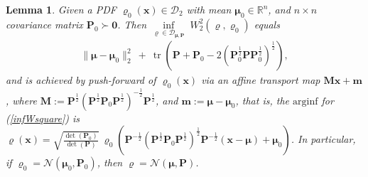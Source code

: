 \documentclass[letterpaper,10pt,twocolumn,conference]{ieeeconf}
\newtheorem{lemma}{Lemma}
\newcommand{\cD}{{\mathscr{D}}}
\newcommand{\tr}{\operatorname{tr}}
\begin{document}
\begin{lemma}\label{WsqareProjLemma}
Given a PDF $\varrho_{0}(\bm{x})\in\cD_{2}$ with mean $\bm{\mu}_{0}\in\mathbb{R}^{n}$, and $n\times n$ covariance matrix $\bm{P}_{0} \succ \bm{0}$. Then $\underset{\varrho\in\cD_{\bm{\mu},\bm{P}}}{\inf} \; W_{2}^{2}\left(\varrho,\varrho_{0}\right)$ equals
	\begin{eqnarray}
	 \parallel\bm{\mu}-\bm{\mu}_{0}\parallel_{2}^{2} \: + \: \tr\left(\bm{P} + \bm{P}_{0} - 2 \left(\bm{P}_{0}^{\frac{1}{2}} \bm{P} \bm{P}_{0}^{\frac{1}{2}}\right)^{\frac{1}{2}}\right),
	\label{infWsquare}	
	\end{eqnarray}
and is achieved by push-forward of $\varrho_{0}(\bm{x})$ via an affine transport map $\bm{M}\bm{x} + \bm{m}$, where $\bm{M} := \bm{P}^{\frac{1}{2}} \left(\bm{P}^{\frac{1}{2}}\bm{P}_{0}\bm{P}^{\frac{1}{2}}\right)^{-\frac{1}{2}} \bm{P}^{\frac{1}{2}}$, and $\bm{m}:=\bm{\mu}-\bm{\mu}_{0}$, that is, the $\mathrm{arginf}$ for (\ref{infWsquare}) is $\varrho(\bm{x}) = \sqrt{\frac{\det(\bm{P}_{0})}{\det(\bm{P})}}\:\varrho_{0}\left( \bm{P}^{-\frac{1}{2}} \left(\bm{P}^{\frac{1}{2}}\bm{P}_{0}\bm{P}^{\frac{1}{2}}\right)^{\frac{1}{2}} \bm{P}^{-\frac{1}{2}}\left(\bm{x} - \bm{\mu}\right) + \bm{\mu}_{0}\right)$. In particular, if $\varrho_{0} = \mathcal{N}\left(\bm{\mu}_{0},\bm{P}_{0}\right)$, then $\varrho = \mathcal{N}\left(\bm{\mu},\bm{P}\right)$.
\end{lemma}
\end{document}
